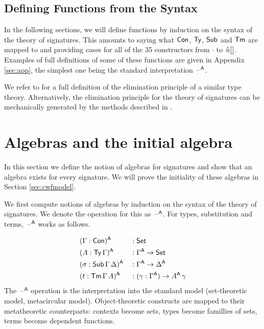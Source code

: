 \documentclass[acmsmall,screen]{acmart}
\begin{document}
\subsection{Defining Functions from the Syntax}
\label{sec:syntaxfunctions}

In the following sections, we will define functions by induction on
the syntax of the theory of signatures. This amounts to saying what
$\mathsf{Con}$, $\mathsf{Ty}$, $\mathsf{Sub}$ and $\mathsf{Tm}$ are mapped to and providing cases for
all of the 35 constructors from $\cdot$ to ${\mathop{\hat{\mathop{{\scriptstyle @}}}}[]}$. Examples of
full definitions of some of these functions are given in Appendix
\ref{sec:app}, the simplest one being the standard interpretation
$\mathord{\hspace{1pt}\text{--}\hspace{1pt}}^{\mathsf{A}}$.

We refer to \cite{ttintt} for a full definition of the elimination
principle of a similar type theory. Alternatively, the elimination
principle for the theory of signatures can be mechanically generated
by the methods described in \cite{kaposi_et_al:LIPIcs:2018:9190}.


\section{Algebras and the initial algebra}
\label{sec:algebras}

In this section we define the notion of algebras for signatures and
show that an algebra exists for every signature. We will prove
the initiality of these algebras in Section \ref{sec:cwfmodel}.

We first compute notions of algebras by induction on the syntax of the
theory of signatures. We denote the operation for this as $\mathord{\hspace{1pt}\text{--}\hspace{1pt}}^{\mathsf{A}}$.
For types, substitution and terms, $\mathord{\hspace{1pt}\text{--}\hspace{1pt}}^{\mathsf{A}}$ works as follows.

\begin{alignat*}{5}
  & (\Gamma:\mathsf{Con})^{\mathsf{A}} && : \mathsf{Set} \\
  & (A:\mathsf{Ty}\,\Gamma)^{\mathsf{A}} && : \Gamma^{\mathsf{A}}\rightarrow\mathsf{Set} \\
  & (\sigma:\mathsf{Sub}\,\Gamma\,\Delta)^{\mathsf{A}} && : \Gamma^{\mathsf{A}}\rightarrow\Delta^{\mathsf{A}} \\
  & (t:\mathsf{Tm}\,\Gamma\,A)^{\mathsf{A}} && : (\gamma:\Gamma^{\mathsf{A}})\rightarrow A^{\mathsf{A}}\,\gamma
\end{alignat*}
The $\mathord{\hspace{1pt}\text{--}\hspace{1pt}}^{\mathsf{A}}$ operation is the interpretation into the standard
model (set-theoretic model, metacircular model). Object-theoretic
constructs are mapped to their metatheoretic counterparts: contexts
become sets, types become famillies of sets, terms become dependent
functions.
\end{document}
